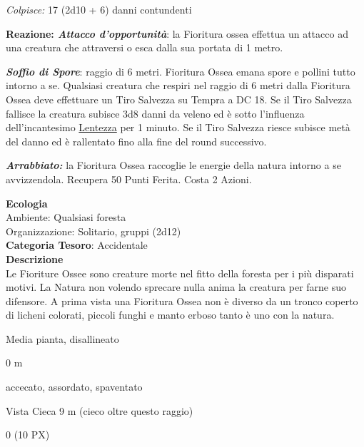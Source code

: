 \begin{multicols}{2}
{\emph{Colpisce:} 17 (2d10 + 6) danni contundenti

\textbf{Reazione: \emph{Attacco d'opportunità}}: la Fioritura ossea effettua un attacco ad una creatura che attraversi o esca dalla sua portata di 1 metro.

\emph{\textbf{Soffio di Spore}}: raggio di 6 metri. Fioritura Ossea emana spore e pollini tutto intorno a se. Qualsiasi creatura che respiri nel raggio di 6 metri dalla Fioritura Ossea deve effettuare un Tiro Salvezza su Tempra a DC 18. Se il Tiro Salvezza fallisce la creatura subisce 3d8 danni da veleno ed è sotto l'influenza dell'incantesimo \hyperlink{lentezza}{Lentezza} per 1 minuto. Se il Tiro Salvezza riesce subisce metà del danno ed è rallentato fino alla fine del round successivo.

\emph{\textbf{Arrabbiato:}} la Fioritura Ossea raccoglie le energie della natura intorno a se avvizzendola. Recupera 50 Punti Ferita. Costa 2 Azioni.

\textbf{Ecologia}\\
Ambiente: Qualsiasi foresta\\
Organizzazione: Solitario, gruppi (2d12)\\
\textbf{Categoria Tesoro}: Accidentale\\
\textbf{Descrizione}\\
Le Fioriture Ossee sono creature morte nel fitto della foresta per i più disparati motivi. La Natura non volendo sprecare nulla anima la creatura per farne suo difensore. A prima vista una Fioritura Ossea non è diverso da un tronco coperto di licheni colorati, piccoli funghi e manto erboso tanto è uno con la natura.

\begin{description}[noitemsep, topsep=0pt, parsep=0pt, partopsep=0pt, itemsep=1pt, leftmargin=2.35cm,  labelwidth=2.2cm, itemindent=0cm, listparindent=0pt] %
\setlength{\baselineskip}{10pt}
\item[\textbf{Taglia/Tipo}] Media pianta, disallineato
\item[\textbf{Caratt.}] 
\item[\textbf{Punti Ferita}] 
\item[\textbf{Movimento}] 0 m
\item[\textbf{Tiri Salvez.}] 
\item[\textbf{Immunità}] accecato, assordato, spaventato
\item[\textbf{Sensi}] Vista Cieca 9 m (cieco oltre questo raggio)
\item[\textbf{Sfida}] 0 (10 PX)
\end{description}
\smallskip

}
\end{multicols}
